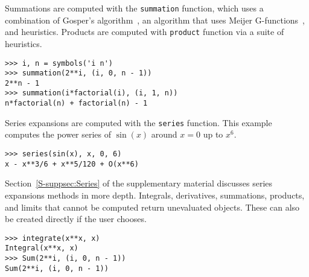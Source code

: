 Summations are computed with the \verb|summation| function, which uses a
combination of Gosper's algorithm~\cite{gosper1978decision}, an algorithm that
uses Meijer G-functions~\cite{Roach1996hyper,roach1997meijerg}, and
heuristics. Products are computed with \verb|product| function via a suite of
heuristics.
\begin{verbatim}
>>> i, n = symbols('i n')
>>> summation(2**i, (i, 0, n - 1))
2**n - 1
>>> summation(i*factorial(i), (i, 1, n))
n*factorial(n) + factorial(n) - 1
\end{verbatim}

Series expansions are computed with the \verb|series| function. This example computes the power series of $\sin(x)$ around $x=0$ up to $x^6$.
\begin{verbatim}
>>> series(sin(x), x, 0, 6)
x - x**3/6 + x**5/120 + O(x**6)
\end{verbatim}
Section~\ref{S-suppsec:Series} of the supplementary material discusses series
expansions methods in more depth. Integrals, derivatives, summations,
products, and limits that cannot be computed return unevaluated objects. These
can also be created directly if the user chooses.
\begin{verbatim}
>>> integrate(x**x, x)
Integral(x**x, x)
>>> Sum(2**i, (i, 0, n - 1))
Sum(2**i, (i, 0, n - 1))
\end{verbatim}

